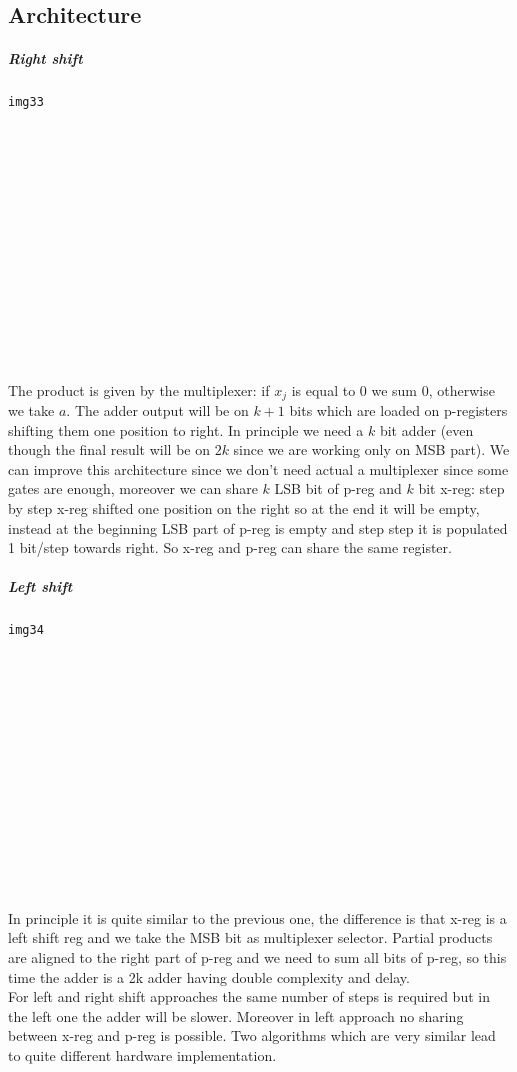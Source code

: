 \subsection{Architecture}

\subparagraph{Right shift}

\begin{verbatim}
img33














\end{verbatim}

The product is given by the multiplexer: if $x_j$ is equal to 0 we sum 0, otherwise we take $a$.
The adder output will be on $k+1$ bits which are loaded on p-registers shifting them one position to right. In principle we need a $k$ bit adder (even though the final result will be on $2k$ since we are working only on MSB part). We can improve this architecture since we don't need actual a multiplexer since some gates are enough, moreover we can share $k$ LSB bit of p-reg and $k$ bit x-reg: step by step x-reg shifted one position on the right so at the end it will be empty, instead at the beginning LSB part of p-reg is empty and step step it is populated 1 bit/step towards right. So x-reg and p-reg can share the same register.

\subparagraph{Left shift}
\begin{verbatim}
img34














\end{verbatim}

In principle it is quite similar to the previous one, the difference is that x-reg is a left shift reg and we take the MSB bit as multiplexer selector. Partial products are aligned to the right part of p-reg and we need to sum all bits of p-reg, so this time the adder is a 2k adder having double complexity and delay.\\

For left and right shift approaches the same number of steps is required but in the left one the adder will be slower. Moreover in left approach no sharing between x-reg and p-reg is possible. Two algorithms which are very similar lead to quite different hardware implementation.

